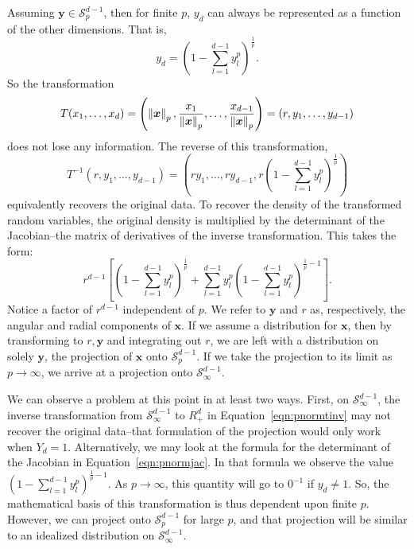 Assuming $\bm{y} \in \mathcal{S}_{p}^{d-1}$, then for finite $p$, $y_d$ can always be represented
  as a function of the other dimensions.  That is,
  \begin{equation*}
    y_d = \left(1 - {\textstyle\sum}_{l = 1}^{d-1}y_l^p\right)^{\frac{1}{p}}.
  \end{equation*}
  So the transformation
  \begin{equation}
    \label{eqn:pnormt}
    T(x_1,\ldots,x_d) = \left(\left\lVert \bm{x} \right\rVert_{p}, \frac{x_1}{\left\lVert \bm{x} \right\rVert_{p}},
                          \ldots , \frac{x_{d-1}}{\left\lVert \bm{x} \right\rVert_{p}}\right) = (r,y_1,\ldots,y_{d-1})
  \end{equation}
  does not lose any information.  The reverse of this transformation,
  \begin{equation}
    \label{eqn:pnormtinv}
    T^{-1}\left(r,y_1,\ldots,y_{d-1}\right) =
      \left(ry_1,\ldots,ry_{d-1}, r\left(1 - {\textstyle\sum}_{l = 1}^{d-1}y_l^p\right)^{\frac{1}{p}}\right)
  \end{equation}
  equivalently recovers the original data.  To recover the density of the transformed random variables,
  the original density is multiplied by the determinant of the Jacobian--the matrix of derivatives
  of the inverse transformation.  This takes the form:
  \begin{equation}
    \label{eqn:pnormjac}
    r^{d-1}\left[\left(1 - {\textstyle\sum}_{l = 1}^{d-1}y_l^p\right)^{\frac{1}{p}} +
        {\textstyle\sum}_{l = 1}^{d-1}y_l^p\left(1 - {\textstyle\sum}_{l=1}^{d-1} y_l^p\right)^{\frac{1}{p} - 1}\right].
  \end{equation}
  Notice a factor of $r^{d-1}$ independent of $p$. We refer to $\bm{y}$ and $r$ as, respectively,
  the angular and radial components of $\bm{x}$.  If we assume a distribution for $\bm{x}$, then
  by transforming to $r, \bm{y}$ and integrating out $r$, we are left with a distribution on solely
  $\bm{y}$, the projection of $\bm{x}$ onto $\mathcal{S}_{p}^{d-1}$.  If we take the projection to
  its limit as $p\to\infty$, we arrive at a projection onto $\mathcal{S}_{\infty}^{d-1}$.
  
We can observe a problem at this point in at least two ways.  First, on $\mathcal{S}_{\infty}^{d-1}$, the
  inverse transformation from $\mathcal{S}_{\infty}^{d-1}$ to $R_+^{d}$ in Equation~\ref{eqn:pnormtinv} 
  may not recover the original data--that formulation of the projection would only work when $Y_d = 1$.
  Alternatively, we may look at the formula for the determinant of the Jacobian in
  Equation~\ref{eqn:pnormjac}.  In that formula we observe the value 
  $(1 - \sum_{l = 1}^{d-1}y_l^p)^{\frac{1}{p} - 1}$.  As $p\to\infty$, 
  this quantity will go to $0^{-1}$ if $y_d \neq 1$.
  So, the mathematical basis of this transformation is thus dependent upon finite $p$.  However, we can
  project onto $\mathcal{S}_p^{d-1}$ for large $p$, and that projection will be similar to an idealized distribution on $\mathcal{S}_{\infty}^{d-1}$.

